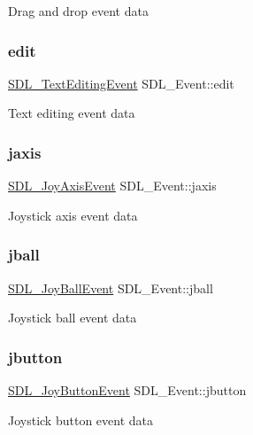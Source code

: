 Drag and drop event data \mbox{\label{union_s_d_l___event_a9a7e3b67b2654d4c5fc509676c6a7183}} 
\subsubsection{\texorpdfstring{edit}{edit}}
{\footnotesize\ttfamily \mbox{\hyperlink{struct_s_d_l___text_editing_event}{S\+D\+L\+\_\+\+Text\+Editing\+Event}} S\+D\+L\+\_\+\+Event\+::edit}

Text editing event data \mbox{\label{union_s_d_l___event_ac4611acd0e9c675e67dc20919f0accb4}} 
\subsubsection{\texorpdfstring{jaxis}{jaxis}}
{\footnotesize\ttfamily \mbox{\hyperlink{struct_s_d_l___joy_axis_event}{S\+D\+L\+\_\+\+Joy\+Axis\+Event}} S\+D\+L\+\_\+\+Event\+::jaxis}

Joystick axis event data \mbox{\label{union_s_d_l___event_ae433f511e3383d17f8fe02df745ee8f8}} 
\subsubsection{\texorpdfstring{jball}{jball}}
{\footnotesize\ttfamily \mbox{\hyperlink{struct_s_d_l___joy_ball_event}{S\+D\+L\+\_\+\+Joy\+Ball\+Event}} S\+D\+L\+\_\+\+Event\+::jball}

Joystick ball event data \mbox{\label{union_s_d_l___event_a591104d64903ae1cf70874fb5d3124ff}} 
\subsubsection{\texorpdfstring{jbutton}{jbutton}}
{\footnotesize\ttfamily \mbox{\hyperlink{struct_s_d_l___joy_button_event}{S\+D\+L\+\_\+\+Joy\+Button\+Event}} S\+D\+L\+\_\+\+Event\+::jbutton}

Joystick button event data \mbox{\label{union_s_d_l___event_a17514dc19a846ea1b5fbe44123700c4c}} 
